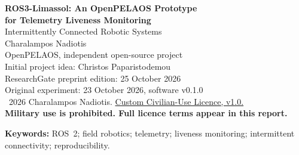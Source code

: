 \documentclass[11pt,a4paper]{article}
\begin{document}
\thispagestyle{plain}
\begin{center}
{\LARGE\bfseries ROS3-Limassol: An OpenPELAOS Prototype\\[3pt]
for Telemetry Liveness Monitoring}\\[8pt]
{\large Intermittently Connected Robotic Systems}\\[11pt]
Charalampos Nadiotis\\[3pt]
OpenPELAOS, independent open-source project\\[5pt]
{\small Initial project idea: Christos Paparistodemou}\\[5pt]
{\small ResearchGate preprint edition: 25 October 2026}\\[3pt]
{\small Original experiment: 23 October 2026, software v0.1.0}\\[5pt]
{\footnotesize\textcopyright\ 2026 Charalampos Nadiotis.\quad
\hyperref[sec:licence]{Custom Civilian-Use Licence, v1.0.}}\\[2pt]
{\footnotesize\textbf{Military use is prohibited. Full licence terms appear in this report.}}
\end{center}

\begin{abstract}
Robotic telemetry can stop arriving because of communication disruption, publisher
failure, or upstream data interruption. A receiver therefore needs an explicit
rule for interpreting the absence of valid messages. This report describes
ROS3-Limassol, an OpenPELAOS development prototype comprising a transport-independent
Python core, a synthetic unmanned surface vehicle telemetry source, and an optional
ROS~2 adapter. The observer evaluates elapsed receiver time since the last accepted
message and distinguishes waiting, healthy, and stale states. Schema validation,
session identifiers, and increasing sequence numbers prevent several malformed
or replayed messages from refreshing that timer. A deterministic experiment
with a three-second blackout reproduces stale detection and recovery, accepting
51 of 81 generated samples. In the original version-0.1.0 validation, eighteen core tests pass; one ROS graph test is
explicitly skipped because ROS~2 is unavailable in the authoring environment.
The evidence establishes software behavior under a specified synthetic scenario.
Real transport timing, field performance, and research novelty remain unestablished.
\end{abstract}
{\small\textbf{Keywords:} ROS~2; field robotics; telemetry; liveness monitoring;
intermittent connectivity; reproducibility.}
\end{document}
